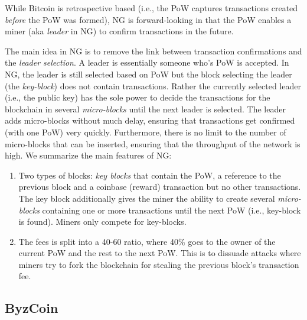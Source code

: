 \documentclass[]{report}   %
\begin{document}
While Bitcoin is retrospective based (i.e., the PoW captures transactions created {\em before} the PoW was formed), NG is forward-looking in that the PoW enables a miner (aka {\em leader} in NG) to confirm transactions in the future. 

The main idea in NG is to remove the link between transaction confirmations and the {\em leader selection}. A leader is essentially someone who's PoW is accepted. In NG, the leader is still selected based on PoW but the block selecting the leader (the {\em key-block}) does not contain transactions. Rather the currently selected leader (i.e., the public key) has the sole power to decide the transactions for the blockchain in several {\em micro-blocks} until the next leader is selected. The leader adds micro-blocks without much delay, ensuring that transactions get confirmed (with one PoW) very quickly. Furthermore, there is no limit to the number of micro-blocks that can be inserted, ensuring that the throughput of the network is high.
We summarize the main features of NG:
\begin{enumerate}
	\item Two types of blocks: {\em key blocks} that contain the PoW, a reference to the previous block and a coinbase (reward) transaction but no other transactions. The key block additionally gives the miner the ability to create several {\em micro-blocks} containing one or more transactions until the next PoW (i.e., key-block is found). Miners only compete for key-blocks.
	\item The fees is split into a 40-60 ratio, where 40\% goes to the owner of the current PoW and the rest to the next PoW. This is to dissuade attacks where miners try to fork the blockchain for stealing the previous block's transaction fee.
\end{enumerate}

\subsection{ByzCoin}
\end{document}
